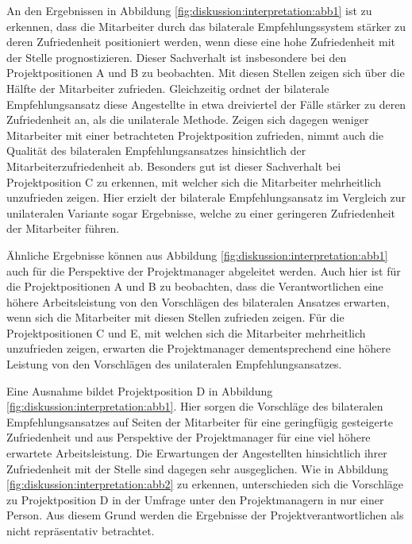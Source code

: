 An den Ergebnissen in Abbildung \ref{fig:diskussion:interpretation:abb1} ist zu erkennen, dass die Mitarbeiter durch das bilaterale Empfehlungssystem stärker zu deren Zufriedenheit positioniert werden, wenn diese eine hohe Zufriedenheit mit der Stelle prognostizieren. Dieser Sachverhalt ist insbesondere bei den Projektpositionen A und B zu beobachten. Mit diesen Stellen zeigen sich über die Hälfte der Mitarbeiter zufrieden. Gleichzeitig ordnet der bilaterale Empfehlungsansatz diese Angestellte in etwa dreiviertel der Fälle stärker zu deren Zufriedenheit an, als die unilaterale Methode. Zeigen sich dagegen weniger Mitarbeiter mit einer betrachteten Projektposition zufrieden, nimmt auch die Qualität des bilateralen Empfehlungsansatzes hinsichtlich der Mitarbeiterzufriedenheit ab. Besonders gut ist dieser Sachverhalt bei Projektposition C zu erkennen, mit welcher sich die Mitarbeiter mehrheitlich unzufrieden zeigen. Hier erzielt der bilaterale Empfehlungsansatz im Vergleich zur unilateralen Variante sogar Ergebnisse, welche zu einer geringeren Zufriedenheit der Mitarbeiter führen.

Ähnliche Ergebnisse können aus Abbildung \ref{fig:diskussion:interpretation:abb1} auch für die Perspektive der Projektmanager abgeleitet werden. Auch hier ist für die Projektpositionen A und B zu beobachten, dass die Verantwortlichen eine höhere Arbeitsleistung von den Vorschlägen des bilateralen Ansatzes erwarten, wenn sich die Mitarbeiter mit diesen Stellen zufrieden zeigen. Für die Projektpositionen C und E, mit welchen sich die Mitarbeiter mehrheitlich unzufrieden zeigen, erwarten die Projektmanager dementsprechend eine höhere Leistung von den Vorschlägen des unilateralen Empfehlungsansatzes.

Eine Ausnahme bildet Projektposition D in Abbildung \ref{fig:diskussion:interpretation:abb1}. Hier sorgen die Vorschläge des bilateralen Empfehlungsansatzes auf Seiten der Mitarbeiter für eine geringfügig gesteigerte Zufriedenheit und aus Perspektive der Projektmanager für eine viel höhere erwartete Arbeitsleistung. Die Erwartungen der Angestellten hinsichtlich ihrer Zufriedenheit mit der Stelle sind dagegen sehr ausgeglichen. Wie in Abbildung \ref{fig:diskussion:interpretation:abb2} zu erkennen, unterschieden sich die Vorschläge zu Projektposition D in der Umfrage unter den Projektmanagern in nur einer Person. Aus diesem Grund werden die Ergebnisse der Projektverantwortlichen als nicht repräsentativ betrachtet.

